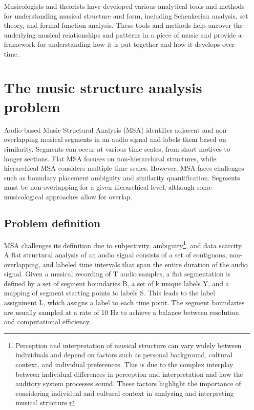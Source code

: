 Musicologists and theorists have developed various analytical tools and methods for understanding musical structure and form, including Schenkerian analysis, set theory, and formal function analysis. These tools and methods help uncover the underlying musical relationships and patterns in a piece of music and provide a framework for understanding how it is put together and how it develops over time.

\section{The music structure analysis problem}

Audio-based Music Structural Analysis (MSA) identifies adjacent and non-overlapping musical segments in an audio signal and labels them based on similarity. Segments can occur at various time scales, from short motives to longer sections. Flat MSA focuses on non-hierarchical structures, while hierarchical MSA considers multiple time scales. However, MSA faces challenges such as boundary placement ambiguity and similarity quantification. Segments must be non-overlapping for a given hierarchical level, although some musicological approaches allow for overlap.

\subsection{Problem definition}

MSA challenges its definition due to subjectivity, ambiguity\footnote{Perception and interpretation of musical structure can vary widely between individuals and depend on factors such as personal background, cultural context, and individual preferences. This is due to the complex interplay between individual differences in perception and interpretation and how the auditory system processes sound. These factors highlight the importance of considering individual and cultural context in analyzing and interpreting musical structure.}, and data scarcity. A flat structural analysis of an audio signal consists of a set of contiguous, non-overlapping, and labeled time intervals that span the entire duration of the audio signal. Given a musical recording of T audio samples, a flat segmentation is defined by a set of segment boundaries B, a set of k unique labels Y, and a mapping of segment starting points to labels S. This leads to the label assignment L, which assigns a label to each time point. The segment boundaries are usually sampled at a rate of 10 Hz to achieve a balance between resolution and computational efficiency.

